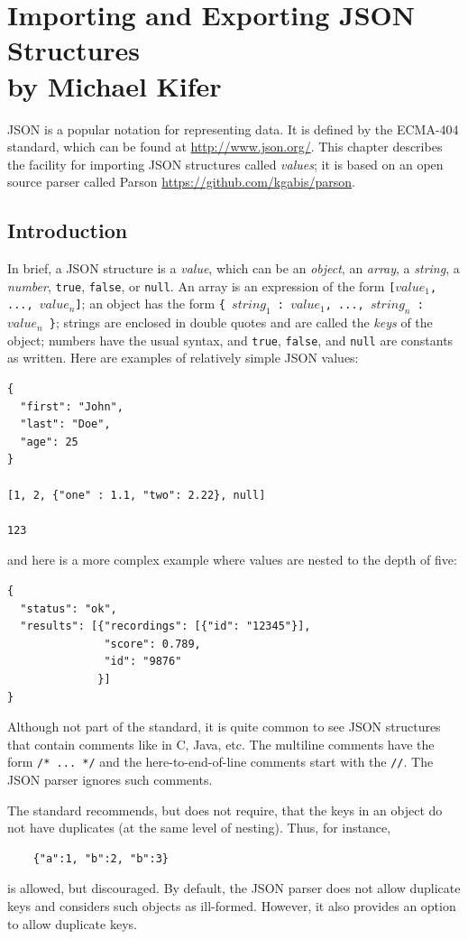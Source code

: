 \chapter[Importing JSON Structures]
{Importing and Exporting JSON Structures\\
  {\Large by Michael Kifer}}

JSON is a popular notation for representing data. It is defined
by the ECMA-404 standard, which can be found at \url{http://www.json.org/}.
This chapter describes the \ERGO facility for importing JSON structures
called \emph{values}; it is based on an open source parser called Parson
\url{https://github.com/kgabis/parson}.

\section{Introduction}

In brief, a JSON structure is a \emph{value}, which can be
  an \emph{object}, an
\emph{array}, a \emph{string}, a \emph{number},  \texttt{true}, \texttt{false},
or \texttt{null}. An array is an expression of the form
\texttt{[$value_1$, ..., $value_n$]}; an object has the form
\texttt{\{ $string_1$ : $value_1$,  ..., $string_n$ : $value_n$
  \}}; strings are enclosed in double quotes and are called the \emph{keys}
of the object; numbers have the usual
syntax, and \texttt{true}, \texttt{false}, and \texttt{null} are constants
as written. Here are examples of relatively simple JSON values:
\begin{verbatim}
{
  "first": "John",
  "last": "Doe",
  "age": 25
}

[1, 2, {"one" : 1.1, "two": 2.22}, null]

123
\end{verbatim}
and here is a more complex example where values are nested to the depth of
five:
\begin{verbatim}
{
  "status": "ok",
  "results": [{"recordings": [{"id": "12345"}],
               "score": 0.789,
               "id": "9876"
              }]
}
\end{verbatim}

Although not part of the standard, it is quite common to see JSON
structures that contain comments like in C, Java, etc. The multiline
comments have the form \texttt{/* ... */} and the here-to-end-of-line
comments start with the \texttt{//}. The JSON parser ignores such comments.

The standard recommends, but does not require, that the keys in an object
do not have duplicates (at the same level of nesting). Thus, for instance,
\begin{verbatim}
    {"a":1, "b":2, "b":3}
\end{verbatim}
is allowed, but discouraged. By default, the JSON parser does not allow
duplicate keys and considers such objects as ill-formed. However, it also
provides an option to allow duplicate keys.


